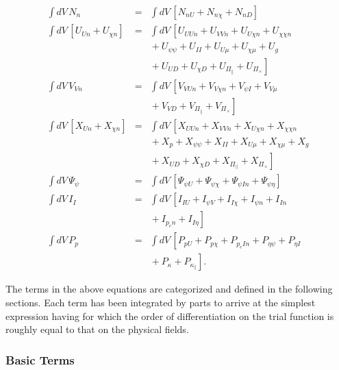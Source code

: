 \documentclass[letterpaper]{book}
\newcommand{\tensor}[1]{\mathsf{#1}}
\renewcommand{\P}{\tensor{\Pi}}
\begin{document}
\begin{subequations}
\begin{eqnarray}
  \int dV\, N_n & = & \int dV\, \left[
    N_{n U} + N_{n \chi} + N_{n D} \right]
  \\
  \int dV\, \left[U_{U n} + U_{\chi n}\right] & = & \int dV\, \left[
    U_{U U n} + U_{V V n} + U_{U \chi n} + U_{\chi \chi n}  \right.\\
     && \left. \mbox{} + U_{\psi \psi} + U_{I I} + U_{U \mu} + U_{\chi \mu}
    + U_g \right. \\ && \left. \mbox{} 
    + U_{U D} + U_{\chi D} + U_{\P_\parallel} + U_{\P_\times}
    \right]\nonumber
  \\
  \int dV\, V_{V n} & = & \int dV\, \left[
    V_{V U n} + V_{V \chi n} + V_{\psi I} + V_{V \mu} \right. \\
    && \left. \mbox{} + V_{V D}  
    + V_{\P_\parallel} + V_{\P_\times} \right]
  \\
  \int dV\, \left[X_{U n} + X_{\chi n}\right] & = & \int dV\, \left[
    X_{U U n}+ X_{V V n}+ X_{U \chi n}+ X_{\chi \chi n} \right.\\
     && \left. \mbox{} 
    + X_p + X_{\psi \psi} + X_{I I} + X_{U \mu} + X_{\chi \mu} 
    + X_g \right. \\ && \left. \mbox{} 
    + X_{U D} + X_{\chi D} + X_{\P_\parallel} + X_{\P_\times}
    \right]\nonumber
  \\
  \int dV\, \Psi_\psi & = & \int dV\, \left[
    \Psi_{\psi U} + \Psi_{\psi \chi} + \Psi_{\psi I n}
    + \Psi_{\psi \eta} \right]
  \\
  \int dV\, I_I & = & \int dV\, \left[
    I_{I U} + I_{\psi V} + I_{I \chi} + I_{\psi n} + I_{I n} \right.
    \\ && \left. \mbox{} + I_{p_e n} + I_{I \eta} \right]
  \\
  \int dV\, P_p & = & \int dV\, \left[
    P_{p U} + P_{p \chi} + P_{p_e I n} + P_{\eta \psi} + P_{\eta I} \right. \\
    && \left. \mbox{} + P_\kappa + P_{\kappa_\parallel} \right]\nonumber.
\end{eqnarray}
\end{subequations}

The terms in the above equations are categorized and defined in the
following sections.  Each term has been integrated by parts to arrive
at the simplest expression having for which the order of
differentiation on the trial function is roughly equal to that on the
physical fields.

\subsubsection{Basic Terms}
\end{document}

